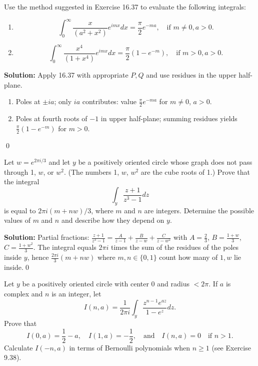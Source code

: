 \begin{problembox}
Use the method suggested in Exercise 16.37 to evaluate the following integrals:
\begin{enumerate}[label=(\alph*)]
\item \[ \int_0^{\infty} \frac{x}{(a^2 + x^2)} e^{imx} dx = \frac{\pi}{2} e^{-ma}, \quad \text{if } m \neq 0, a > 0. \]
\item \[ \int_0^{\infty} \frac{x^4}{(1 + x^4)} e^{imx} dx = \frac{\pi}{2} (1 - e^{-m}), \quad \text{if } m > 0, a > 0. \]
\end{enumerate}
\end{problembox}

\noindent\textbf{Solution:}
Apply 16.37 with appropriate $P,Q$ and use residues in the upper half-plane.
\begin{enumerate}[label=(\alph*)]
\item Poles at $\pm ia$; only $ia$ contributes: value $\frac{\pi}{2}e^{-ma}$ for $m\ne0$, $a>0$.
\item Poles at fourth roots of $-1$ in upper half-plane; summing residues yields $\frac{\pi}{2}(1-e^{-m})$ for $m>0$.
\end{enumerate}\qed


\begin{problembox}
Let \( w = e^{2\pi i / 3} \) and let \( y \) be a positively oriented circle whose graph does not pass through 1, \( w \), or \( w^2 \). (The numbers 1, \( w \), \( w^2 \) are the cube roots of 1.) Prove that the integral
\[ \int_y \frac{z + 1}{z^3 - 1} dz \]
is equal to \( 2\pi i (m + n w) / 3 \), where \( m \) and \( n \) are integers. Determine the possible values of \( m \) and \( n \) and describe how they depend on \( y \).
\end{problembox}

\noindent\textbf{Solution:}
Partial fractions: $\frac{z+1}{z^3-1}=\frac{A}{z-1}+\frac{B}{z-w}+\frac{C}{z-w^2}$ with $A=\tfrac{2}{3}$, $B=\tfrac{1+w}{3}$, $C=\tfrac{1+w^2}{3}$. The integral equals $2\pi i$ times the sum of the residues of the poles inside $y$, hence $\frac{2\pi i}{3}(m+n w)$ where $m,n\in\{0,1\}$ count how many of $1,w$ lie inside.\qed


\begin{problembox}
Let \( y \) be a positively oriented circle with center 0 and radius \( < 2\pi \). If \( a \) is complex and \( n \) is an integer, let
\[ I(n, a) = \frac{1}{2\pi i} \int_y \frac{z^{n-1} e^{az}}{1 - e^z} dz. \]
Prove that
\[ I(0, a) = \frac{1}{2} - a, \quad I(1, a) = -\frac{1}{2}, \quad \text{and} \quad I(n, a) = 0 \quad \text{if } n > 1. \]
Calculate \( I(-n, a) \) in terms of Bernoulli polynomials when \( n \geq 1 \) (see Exercise 9.38).
\end{problembox}

